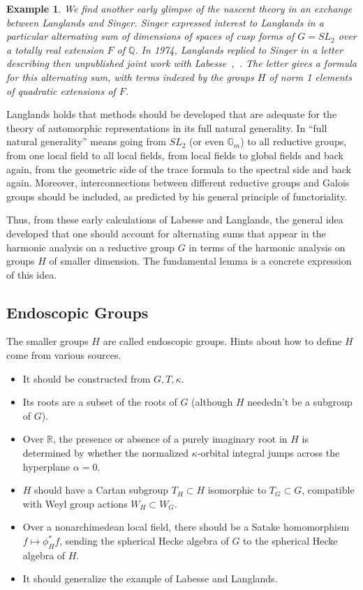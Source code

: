 \documentclass[brochure,english,12pt]{bourbaki}
\newtheorem{example}[equation]{Example}
\newcommand{\ring}[1]{\mathbb{#1}}
\begin{document}
\begin{example}
We find another early glimpse of the nascent theory in an exchange between Langlands and Singer.  Singer
expressed interest to Langlands in a particular alternating sum of
dimensions of spaces of cusp forms of $G=SL_2$ over a totally real
extension $F$ of $\ring{Q}$.  In 1974, Langlands replied to Singer in
a letter describing then unpublished joint work with
Labesse~\cite{Singer},~\cite{LL}.  The letter gives a formula for
this alternating sum, with terms indexed by the groups $H$ of norm 1
elements of quadratic extensions of $F$.  
\end{example}

Langlands holds that  methods should be developed that are adequate for the
theory of automorphic representations in its full natural generality.
In ``full natural generality'' means going from $SL_2$ (or even
$\ring{G}_m$) to all reductive groups, from one local field to all
local fields, from local fields to global fields and back again, from
the geometric side of the trace formula to the spectral side and back
again.  Moreover,  interconnections between different reductive
groups and Galois groups should be included, as predicted by his
general principle of functoriality.

Thus, from these early calculations of Labesse and Langlands, the
general idea developed that one should account for alternating sums
that appear in the harmonic analysis on a reductive group $G$ in terms
of the harmonic analysis on groups $H$ of smaller dimension. 
The fundamental lemma is a concrete expression of this idea. 



\subsection{Endoscopic Groups}

The
smaller groups $H$ are called endoscopic groups.
Hints about how to define $H$ come from various sources.
\begin{itemize}
\item It should be constructed from $G,T,\kappa$.
\item Its roots are a subset of the roots of $G$ (although $H$ neededn't
be a subgroup of $G$).
\item Over $\ring{R}$, the presence or absence of a purely imaginary
root in $H$ is determined by whether the normalized $\kappa$-orbital
integral jumps across the hyperplane $\alpha=0$.
\item $H$ should have a Cartan subgroup $T_H\subset H$ isomorphic to
$T_G\subset G$, compatible with Weyl group actions $W_H\subset W_G$.
\item Over a nonarchimedean local field, there should be a Satake
homomorphism $f \mapsto \phi^*_Hf$, sending the spherical Hecke algebra
of $G$ to the spherical Hecke algebra of $H$.
\item It should generalize the example of Labesse and Langlands.
\end{itemize}
\end{document}

